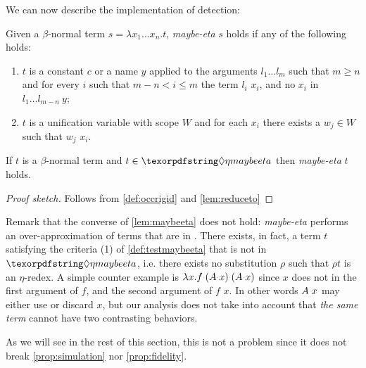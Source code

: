 We can now describe the implementation of \maybeeta detection:

\newcommand{\testmaybeeta}{\emph{maybe-eta}\xspace}
\begin{definition}[\testmaybeeta]\label{def:testmaybeeta}
  Given a $\beta$-normal term
  $s = \lambda x_1 \ldots x_n.t$, \testmaybeeta{} $s$ holds if any
  of the following holds:
  \begin{enumerate}
    \item $t$ is a constant $c$ or a name $y$ applied to the arguments
      $l_1 \ldots l_m$ such that 
      $m \geq n$ and for every $i$ such that $m - n < i \leq m$
      the term  $l_i$
      \reduceto{} $x_i$, and
      no $x_i$ \occursrigid{} in $l_1 \ldots l_{m-n} ~ y$;
    \item $t$ is a
      unification variable with scope $W$ and
      for each $x_i$ there exists a $w_j \in W$ such that $w_j$
      \reduceto{} $x_i$.
  \end{enumerate}
\end{definition}

\begin{lemma}\label{lem:maybeeta}
  If $t$ is a $\beta$-normal term
  and
  $t \in \maybeeta$ then \testmaybeeta{} $t$ holds.
\end{lemma}
\begin{proof}[Proof sketch]
Follows from \cref{def:occrigid} and \cref{lem:reduceto}
\end{proof}


\noindent
Remark that the converse of \cref{lem:maybeeta} does not hold: 
\testmaybeeta performs an over-approximation of terms that are in \maybeeta.
There exists, in fact, a term $t$ satisfying the criteria (1) of
\cref{def:testmaybeeta} that is not in $\maybeeta$, i.e.
there exists no substitution $\rho$ such that $\rho t$ is an
$\eta$-redex. A simple counter example is
$\lambda x. f \appsep (A \appsep x) \appsep (A \appsep x)$
since $x$ does not \occurrigid{} in the first argument
of $f$,
and the second argument of $f$ \reduceto{} $x$.
In other words $A \appsep x$
may either use or discard $x$, but our analysis does not
take into account that \emph{the same
term} cannot have two contrasting behaviors.

As we will see in the rest of this section, this is not a problem
since it does not break
\cref{prop:simulation} nor \cref{prop:fidelity}.

